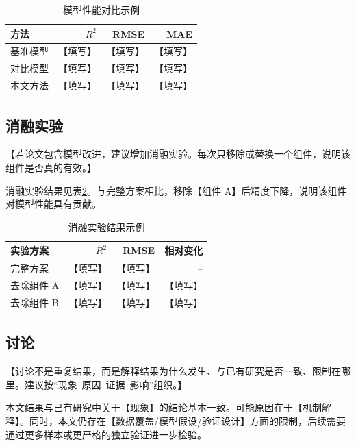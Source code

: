 \begin{table}[ht]
  \centering
  \caption{模型性能对比示例}
  \label{tab:model-performance}
  \begin{tabular}{lrrr}
    \toprule
    方法 & $R^2$ & RMSE & MAE \\
    \midrule
    基准模型 & 【填写】 & 【填写】 & 【填写】 \\
    对比模型 & 【填写】 & 【填写】 & 【填写】 \\
    本文方法 & 【填写】 & 【填写】 & 【填写】 \\
    \bottomrule
  \end{tabular}
\end{table}

\subsection{消融实验}

【若论文包含模型改进，建议增加消融实验。每次只移除或替换一个组件，说明该组件是否真的有效。】

消融实验结果见表\ref{tab:ablation}。与完整方案相比，移除【组件 A】后精度下降，说明该组件对模型性能具有贡献。

\begin{table}[ht]
  \centering
  \caption{消融实验结果示例}
  \label{tab:ablation}
  \begin{tabular}{lrrr}
    \toprule
    实验方案 & $R^2$ & RMSE & 相对变化 \\
    \midrule
    完整方案 & 【填写】 & 【填写】 & -- \\
    去除组件 A & 【填写】 & 【填写】 & 【填写】 \\
    去除组件 B & 【填写】 & 【填写】 & 【填写】 \\
    \bottomrule
  \end{tabular}
\end{table}

\subsection{讨论}

【讨论不是重复结果，而是解释结果为什么发生、与已有研究是否一致、限制在哪里。建议按“现象--原因--证据--影响”组织。】

本文结果与已有研究中关于【现象】的结论基本一致\citep{meyer2021predicting}。可能原因在于【机制解释】。同时，本文仍存在【数据覆盖/模型假设/验证设计】方面的限制，后续需要通过更多样本或更严格的独立验证进一步检验。
